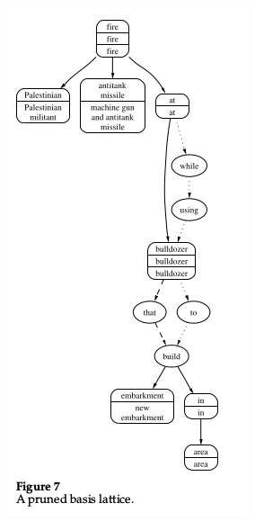 \documentclass[xcolor={table}]{beamer}
\begin{document}
\begin{frame}[t]{\cite{barzilay2005sentence}}
      \begin{figure}[h]
          \centering
      \includegraphics[scale=.3]{images/figure7-barzilay05.png} \\
\end{figure}
\end{frame}
\end{document}
